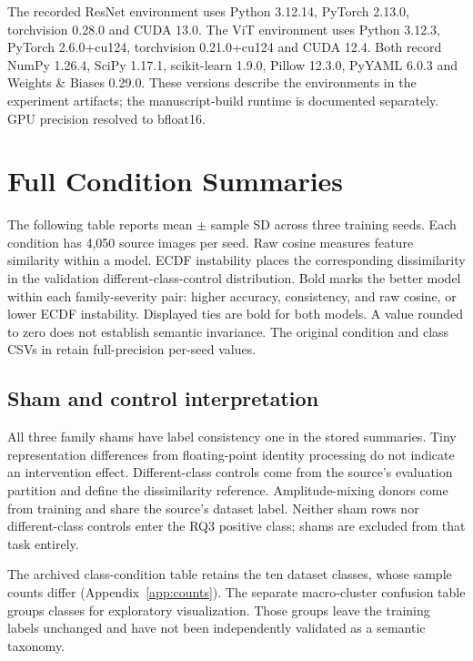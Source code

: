 The recorded ResNet environment uses Python 3.12.14, PyTorch 2.13.0, torchvision 0.28.0 and CUDA 13.0. The ViT environment uses Python 3.12.3, PyTorch 2.6.0+cu124, torchvision 0.21.0+cu124 and CUDA 12.4. Both record NumPy 1.26.4, SciPy 1.17.1, scikit-learn 1.9.0, Pillow 12.3.0, PyYAML 6.0.3 and Weights \& Biases 0.29.0. These versions describe the environments in the experiment artifacts; the manuscript-build runtime is documented separately. GPU precision resolved to bfloat16.

\section{Full Condition Summaries}
The following table reports mean $\pm$ sample SD across three training seeds. Each condition has 4,050 source images per seed. Raw cosine measures feature similarity within a model. ECDF instability places the corresponding dissimilarity in the validation different-class-control distribution. Bold marks the better model within each family-severity pair: higher accuracy, consistency, and raw cosine, or lower ECDF instability. Displayed ties are bold for both models. A value rounded to zero does not establish semantic invariance. The original condition and class CSVs in  retain full-precision per-seed values.
\begin{center}\resizebox{\textwidth}{!}{}\end{center}
\subsection{Sham and control interpretation}
All three family shams have label consistency one in the stored summaries. Tiny representation differences from floating-point identity processing do not indicate an intervention effect. Different-class controls come from the source's evaluation partition and define the dissimilarity reference. Amplitude-mixing donors come from training and share the source's dataset label. Neither sham rows nor different-class controls enter the RQ3 positive class; shams are excluded from that task entirely.

The archived class-condition table retains the ten dataset classes, whose sample counts differ (Appendix~\ref{app:counts}). The separate macro-cluster confusion table groups classes for exploratory visualization. Those groups leave the training labels unchanged and have not been independently validated as a semantic taxonomy.

